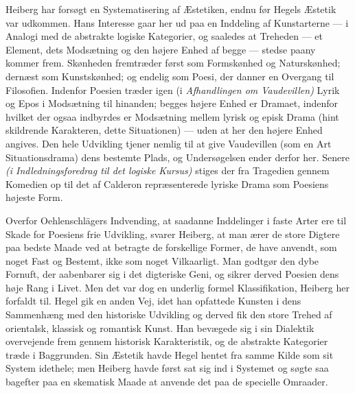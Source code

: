 \documentclass[12pt,a4paper,openany]{book}
\newcommand{\opage}[1]{\marginnote{\footnotesize\textit{[#1]}}}
\begin{document}
Heiberg har forsøgt en Systematisering af Æstetiken, endnu før Hegels Æstetik
var udkommen. Hans Interesse gaar her ud paa en Inddeling af Kunstarterne --- i
Analogi med de abstrakte logiske Kategorier, og saaledes at Treheden --- et
Element, dets Modsætning og den højere Enhed af begge --- stedse paany kommer
frem. Skønheden fremtræder først som Formskønhed og Naturskønhed; dernæst som
Kunstskønhed; og endelig som Poesi, der danner en Overgang til Filosofien.
Indenfor Poesien træder igen (i \textit{Afhandlingen om Vaudevillen)} Lyrik og
Epos i Modsætning til hinanden; begges højere Enhed er Dramaet, indenfor
hvilket der ogsaa indbyrdes er Modsætning mellem lyrisk og episk Drama (hint
skildrende Karakteren, dette Situationen) --- uden at her den højere Enhed
angives. Den hele Udvikling tjener nemlig til at give Vaudevillen (som en Art
Situationsdrama) dens bestemte Plads, og Undersøgelsen ender derfor her. Senere
\textit{(i Indledningsforedrag til det logiske Kursus)} stiges der fra
Tragedien gennem Komedien op til det af Calderon repræsenterede lyriske Drama
som Poesiens højeste Form.

Overfor Oehlenschlägers Indvending, at saadanne Inddelinger i faste Arter ere
til Skade for Poesiens frie Udvikling, svarer Heiberg, at man ærer de store
Digtere paa bedste Maade ved at betragte de forskellige Former, de have
anvendt, som noget Fast og Bestemt, ikke som noget Vilkaarligt. Man godtgør den
dybe Fornuft, der aabenbarer sig i det digteriske Geni, og sikrer derved
Poesien dens høje Rang i Livet. Men det var dog en underlig formel
Klassifikation, Heiberg her forfaldt til. Hegel gik en anden Vej, idet han
opfattede Kunsten i dens Sammenhæng med den historiske Udvikling og derved fik
den store Trehed af orientalsk, klassisk og romantisk Kunst. Han bevægede sig i
sin Dialektik overvejende frem gennem historisk Karakteristik, og de abstrakte
Kategorier træde i Baggrunden. Sin Æstetik havde Hegel hentet fra samme Kilde
som sit System idethele; men Heiberg havde først sat sig ind i Systemet og
søgte saa bagefter
\setcounter{footnote}{0}%
\opage{134}paa en skematisk Maade at anvende det paa de specielle Omraader.
\end{document}
